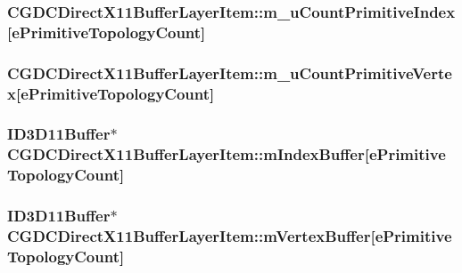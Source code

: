\subsubsection[{m\+\_\+u\+Count\+Primitive\+Index}]{ C\+G\+D\+C\+Direct\+X11\+Buffer\+Layer\+Item\+::m\+\_\+u\+Count\+Primitive\+Index\mbox{[}{\bf e\+Primitive\+Topology\+Count}\mbox{]}}\label{class_c_g_d_c_direct_x11_buffer_layer_item_a8c677279a8c355fa7d946b97a24fbb57}
\hypertarget{class_c_g_d_c_direct_x11_buffer_layer_item_ada713bf18994673621bea4c26c41de3e}{}
\subsubsection[{m\+\_\+u\+Count\+Primitive\+Vertex}]{ C\+G\+D\+C\+Direct\+X11\+Buffer\+Layer\+Item\+::m\+\_\+u\+Count\+Primitive\+Vertex\mbox{[}{\bf e\+Primitive\+Topology\+Count}\mbox{]}}\label{class_c_g_d_c_direct_x11_buffer_layer_item_ada713bf18994673621bea4c26c41de3e}
\hypertarget{class_c_g_d_c_direct_x11_buffer_layer_item_ad03525c09e59ec0fa64386bccd696e95}{}
\subsubsection[{m\+Index\+Buffer}]{\setlength{\rightskip}{0pt plus 5cm}I\+D3\+D11\+Buffer$\ast$ C\+G\+D\+C\+Direct\+X11\+Buffer\+Layer\+Item\+::m\+Index\+Buffer\mbox{[}{\bf e\+Primitive\+Topology\+Count}\mbox{]}}\label{class_c_g_d_c_direct_x11_buffer_layer_item_ad03525c09e59ec0fa64386bccd696e95}
\hypertarget{class_c_g_d_c_direct_x11_buffer_layer_item_a4f922dc0b74dedbd1afdb2bbb2039a5d}{}
\subsubsection[{m\+Vertex\+Buffer}]{\setlength{\rightskip}{0pt plus 5cm}I\+D3\+D11\+Buffer$\ast$ C\+G\+D\+C\+Direct\+X11\+Buffer\+Layer\+Item\+::m\+Vertex\+Buffer\mbox{[}{\bf e\+Primitive\+Topology\+Count}\mbox{]}}\label{class_c_g_d_c_direct_x11_buffer_layer_item_a4f922dc0b74dedbd1afdb2bbb2039a5d}


